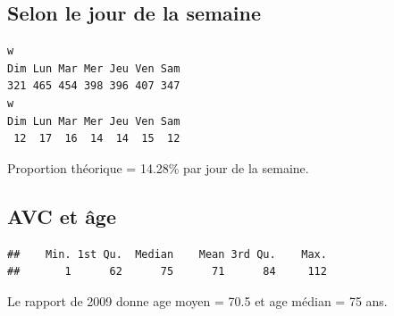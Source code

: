 \documentclass[12pt,english,french,twoside]{book}\usepackage[]{graphicx}\usepackage[]{color}
\makeatletter
\newenvironment{kframe}{%
 \def\at@end@of@kframe{}%
 \ifinner\ifhmode%
  \def\at@end@of@kframe{\end{minipage}}%
  \begin{minipage}{\columnwidth}%
 \fi\fi%
 \def\FrameCommand##1{\hskip\@totalleftmargin \hskip-\fboxsep
 \colorbox{shadecolor}{##1}\hskip-\fboxsep
     \hskip-\linewidth \hskip-\@totalleftmargin \hskip\columnwidth}%
 \MakeFramed {\advance\hsize-\width
   \@totalleftmargin\z@ \linewidth\hsize
   \@setminipage}}%
 {\par\unskip\endMakeFramed%
 \at@end@of@kframe}
\newenvironment{knitrout}{}{} %
\makeatother
\begin{document}
\subsection*{Selon le jour de la semaine}

\begin{knitrout}
\color{fgcolor}\begin{kframe}


{\ttfamily\noindent\bfseries\color{errorcolor}{Error: there is no package called 'gdata'}}\begin{verbatim}
w
Dim Lun Mar Mer Jeu Ven Sam 
321 465 454 398 396 407 347 
w
Dim Lun Mar Mer Jeu Ven Sam 
 12  17  16  14  14  15  12 
\end{verbatim}


{\ttfamily\noindent\bfseries{}}

{\ttfamily\noindent\bfseries\color{errorcolor}{Error: erreur d'évaluation de l'argument 'x' lors de la sélection d'une méthode pour la fonction 'plot' : Erreur : objet 'w2' introuvable}}

{\ttfamily\noindent\bfseries\color{errorcolor}{Error: plot.new has not been called yet}}\end{kframe}
\end{knitrout}

Proportion théorique = 14.28\% par jour de la semaine.

\subsection*{AVC et âge}
\begin{knitrout}
\color{fgcolor}\begin{kframe}
\begin{verbatim}
##    Min. 1st Qu.  Median    Mean 3rd Qu.    Max. 
##       1      62      75      71      84     112
\end{verbatim}
\end{kframe}
\end{knitrout}

Le rapport de 2009 donne age moyen = 70.5 et age médian = 75 ans.
\end{document}
